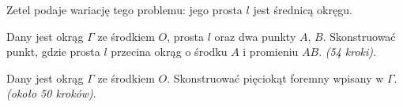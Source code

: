 Zetel \cite[s. 17]{zetel_2020} podaje wariację tego problemu: jego prosta $l$ jest średnicą okręgu.

\begin{problem}
    Dany jest okrąg $\Gamma$ ze środkiem $O$, prosta $l$ oraz dwa punkty $A$, $B$.
    Skonstruować punkt, gdzie prosta $l$ przecina okrąg o środku $A$ i promieniu $AB$. \hfill \emph{(54 kroki)}. %
\end{problem}

\begin{problem}
    Dany jest okrąg $\Gamma$ ze środkiem $O$.
    Skonstruować pięciokąt foremny wpisany w $\Gamma$. \hfill \emph{(około 50 kroków)}. %
\end{problem}


